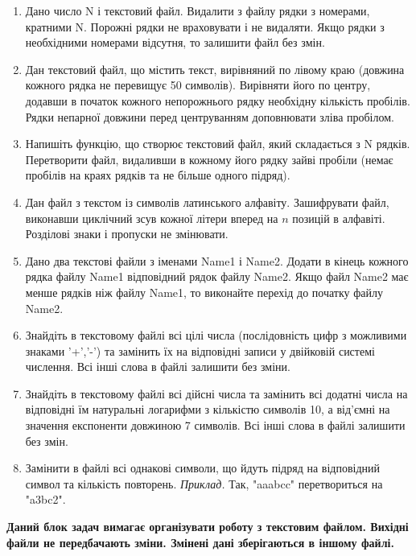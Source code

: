 \documentclass[a5paper,titlepage,openany,twoside,
]
{book_unv}%
\begin{document}
\begin{enumerate}
\def\labelenumi{\arabic{enumi})}
\setcounter{enumi}{9}
\item
  Дано число N і текстовий файл. Видалити з файлу рядки з номерами,
  кратними N. Порожні рядки не враховувати і не видаляти. Якщо рядки з
  необхідними номерами відсутня, то залишити файл без змін. 
\item
  Дан текстовий файл, що містить текст, вирівняний по лівому краю
  (довжина кожного рядка не перевищує 50 символів). Вирівняти його по
  центру, додавши в початок кожного непорожнього рядку необхідну кількість
  пробілів. Рядки непарної довжини перед центруванням доповнювати зліва
  пробілом. 
\item
  Напишіть функцію, що створює текстовий файл, який складається з N рядків. Перетворити
  файл, видаливши в кожному його рядку зайві пробіли (немає пробілів на 
краях рядків та не більше одного підряд). 
\item
  Дан файл з текстом із символів латинського алфавіту. Зашифрувати файл,
  виконавши циклічний зсув кожної літери вперед на $n$ позицій в алфавіті.
  Розділові знаки і пропуски не змінювати.
\item
  Дано два текстові файли з іменами Name1 і Name2. Додати в кінець
  кожного рядка файлу Name1 відповідний рядок файлу Name2. Якщо файл
  Name2 має менше рядків ніж файлу Name1, то виконайте перехід до початку файлу
  Name2.

\item
 Знайдіть в текстовому файлі всі цілі числа (послідовність цифр з можливими знаками '+','-') 
та замінить їх на відповідні записи у двійковій системі числення. 
Всі інші слова в файлі залишити без зміни.

\item
 Знайдіть в текстовому файлі всі дійсні числа та замінить всі додатні числа на відповідні їм
натуральні логарифми з кількістю символів 10, а від'ємні на значення експоненти довжиною 7
символів. Всі інші слова в файлі залишити без змін.

\item
Замінити в файлі всі однакові символи, що йдуть підряд на відповідний символ та кількість повторень.
\emph{Приклад.} Так, "aaabcc" перетвориться на "a3bc2".

\end{enumerate}

\textbf{Даний блок задач вимагає організувати роботу з текстовим файлом.
 Вихідні файли не передбачають зміни. Змінені дані зберігаються в іншому файлі.}
\end{document}
